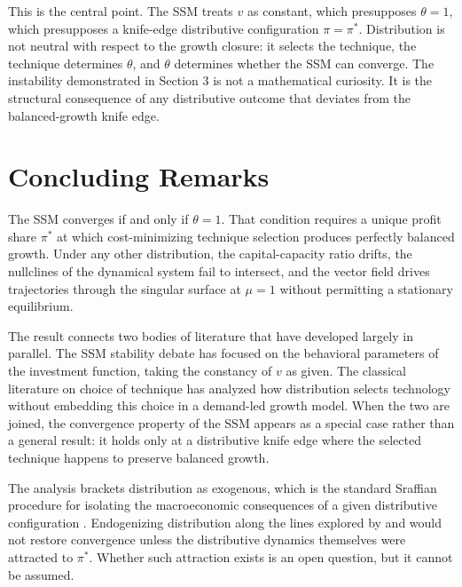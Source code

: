 \documentclass[12pt, a4paper]{article}
\theoremstyle{definition}
\theoremstyle{remark}
\begin{document}
This is the central point. The SSM treats $v$ as constant, which presupposes $\theta = 1$, which presupposes a knife-edge distributive configuration $\pi = \pi^*$. Distribution is not neutral with respect to the growth closure: it selects the technique, the technique determines $\theta$, and $\theta$ determines whether the SSM can converge. The instability demonstrated in Section 3 is not a mathematical curiosity. It is the structural consequence of any distributive outcome that deviates from the balanced-growth knife edge.

\section{Concluding Remarks}

The SSM converges if and only if $\theta = 1$. That condition requires a unique profit share $\pi^*$ at which cost-minimizing technique selection produces perfectly balanced growth. Under any other distribution, the capital-capacity ratio drifts, the nullclines of the dynamical system fail to intersect, and the vector field drives trajectories through the singular surface at $\mu = 1$ without permitting a stationary equilibrium.

The result connects two bodies of literature that have developed largely in parallel. The SSM stability debate \citep{allain2015, lavoie2016, freitas2015, nah2017} has focused on the behavioral parameters of the investment function, taking the constancy of $v$ as given. The classical literature on choice of technique \citep{kurz1995, foley1999} has analyzed how distribution selects technology without embedding this choice in a demand-led growth model. When the two are joined, the convergence property of the SSM appears as a special case rather than a general result: it holds only at a distributive knife edge where the selected technique happens to preserve balanced growth.

The analysis brackets distribution as exogenous, which is the standard Sraffian procedure for isolating the macroeconomic consequences of a given distributive configuration \citep{cesaratto2015}. Endogenizing distribution along the lines explored by \citet{palley2019} and \citet{hein2018} would not restore convergence unless the distributive dynamics themselves were attracted to $\pi^*$. Whether such attraction exists is an open question, but it cannot be assumed.



\end{document}
